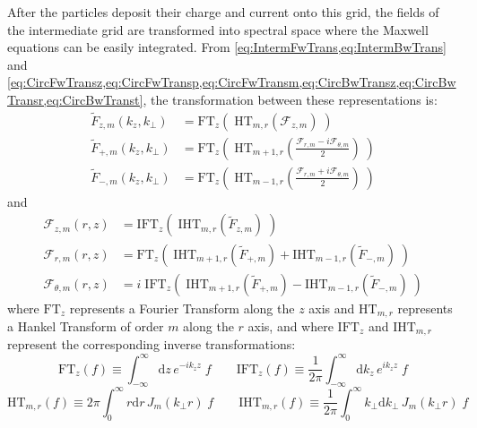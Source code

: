 \documentclass[a4paper]{article}   	%
\newcommand{\Integ}[1]{\int_{-\infty}^{\infty} \!\!\!\!\!
  \mathrm{d}#1}
\newcommand{\RInteg}[1]{\int_{0}^{\infty} \!\!\!\!\! #1\mathrm{d}#1}
\begin{document}
After the particles deposit their charge and current onto this grid,
the fields of the intermediate grid are transformed into spectral
space where the Maxwell equations can be easily integrated. From
\cref{eq:IntermFwTrans,eq:IntermBwTrans} and
\cref{eq:CircFwTransz,eq:CircFwTransp,eq:CircFwTransm,eq:CircBwTransz,eq:CircBwTransr,eq:CircBwTranst}, the transformation between these
representations is:
\begin{align*}
\tilde{F}_{z,m}(k_z,k_\perp) & = \mathrm{FT}_z ( \; \mathrm{HT}_{m,r} ( \mathcal{F}_{z,m} ) \; ) \\
\tilde{F}_{+,m}(k_z,k_\perp) &= \mathrm{FT}_z \left( \; \mathrm{HT}_{m+1,r} \left( \frac{
  \mathcal{F}_{r,m} -i  \mathcal{F}_{\theta,m} }{2}  \right) \;\right) \\
\tilde{F}_{-,m}(k_z,k_\perp) &= \mathrm{FT}_z \left( \; \mathrm{HT}_{m-1,r} \left( \frac{
  \mathcal{F}_{r,m} +i  \mathcal{F}_{\theta,m} }{2}  \right) \;\right) 
\end{align*}
and
\begin{align*}
\mathcal{F}_{z,m}(r,z) &= \mathrm{IFT}_z ( \; \mathrm{IHT}_{m,r} ( \tilde{F}_{z,m} ) \; ) \\
\mathcal{F}_{r,m}(r,z) & = \mathrm{FT}_z \left( \; \mathrm{IHT}_{m+1,r}
                         ( \tilde{F}_{+,m} ) + \mathrm{IHT}_{m-1,r} (
                         \tilde{F}_{-,m} ) \; \right) \\
\mathcal{F}_{\theta,m}(r,z) & = i\;\mathrm{IFT}_z \left( \; \mathrm{IHT}_{m+1,r}
                         ( \tilde{F}_{+,m} ) - \mathrm{IHT}_{m-1,r} ( \tilde{F}_{-,m} ) \; \right)
\end{align*}
where $\mathrm{FT}_z$ represents a Fourier Transform along the $z$
axis and $\mathrm{HT}_{m,r}$ represents a Hankel Transform of order
$m$ along the $r$ axis, and where $\mathrm{IFT}_z$ and
$\mathrm{IHT}_{m,r}$ represent the corresponding inverse
transformations:
\[ \mathrm{FT}_z (f) \equiv \Integ{z} \, e^{-ik_zz} \; f \qquad 
\mathrm{IFT}_z (f) \equiv \frac{1}{2\pi}\Integ{k_z} \, e^{ik_zz} \; f \]
\[ \mathrm{HT}_{m,r} (f) \equiv 2\pi \RInteg{r} \, J_{m}(k_\perp r) \; f \qquad 
\mathrm{IHT}_{m,r} (f) \equiv \frac{1}{2\pi}\RInteg{k_\perp} \,  J_{m}(k_\perp r)  \; f \]
\end{document}
